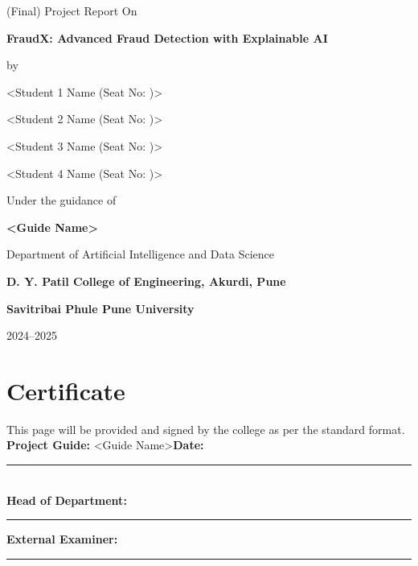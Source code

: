 \documentclass[12pt,a4paper]{report}
\newcommand{\ProjectTitle}{FraudX: Advanced Fraud Detection with Explainable AI}
\newcommand{\AcademicYear}{2024--2025}
\newcommand{\DepartmentName}{Department of Artificial Intelligence and Data Science}
\newcommand{\CollegeName}{D. Y. Patil College of Engineering, Akurdi, Pune}
\newcommand{\UniversityName}{Savitribai Phule Pune University}
\newcommand{\GuideName}{<Guide Name>}
\newcommand{\StudentA}{<Student 1 Name (Seat No: )>}
\newcommand{\StudentB}{<Student 2 Name (Seat No: )>}
\newcommand{\StudentC}{<Student 3 Name (Seat No: )>}
\newcommand{\StudentD}{<Student 4 Name (Seat No: )>}
\begin{document}
\begin{titlepage}
  \centering
  \vspace*{1.0cm}
  {\Large (Final) Project Report On\par}
  \vspace{0.6cm}
  {\LARGE \textbf{\ProjectTitle}\par}
  \vspace{1.0cm}
  {\large by\par}
  \vspace{0.4cm}
  {\large \StudentA\par}
  {\large \StudentB\par}
  {\large \StudentC\par}
  {\large \StudentD\par}
  \vspace{0.9cm}
  {\large Under the guidance of\par}
  \vspace{0.3cm}
  {\large \textbf{\GuideName}\par}
  \vfill
  {\large \DepartmentName\par}
  {\large \textbf{\CollegeName}\par}
  {\large \textbf{\UniversityName}\par}
  {\large \AcademicYear\par}
\end{titlepage}

\chapter*{Certificate}
This page will be provided and signed by the college as per the standard format.\\
\vspace{1.5cm}
\noindent \textbf{Project Guide:} \GuideName \hfill \textbf{Date:} \rule{3cm}{0.4pt}\\[0.6cm]
\noindent \textbf{Head of Department:} \rule{6cm}{0.4pt} \hfill \textbf{External Examiner:} \rule{4cm}{0.4pt}
\end{document}
